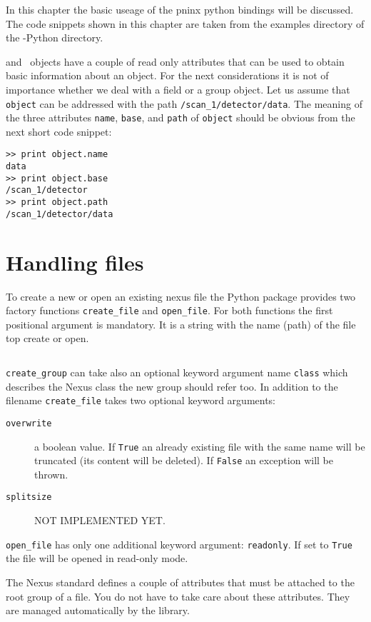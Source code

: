 
In this chapter the basic useage of the pninx python bindings will be discussed.
The code snippets shown in this chapter are taken from the examples directory of
the \pninx-Python directory.

\nxgroup and \nxfield\ objects have a couple of read only attributes that can be used to obtain
basic information about an object. For the next considerations it is not of
importance whether we deal with a field or a group object.
Let us assume that  {\tt object} can be addressed with the path 
{\tt /scan\_1/detector/data}. The meaning of the three attributes 
{\tt name}, {\tt base}, and {\tt path} of {\tt object} should be obvious from
the next short code snippet:
\begin{verbatim}
>> print object.name
data
>> print object.base
/scan_1/detector
>> print object.path
/scan_1/detector/data
\end{verbatim}

\section{Handling files}
To create a new or open an existing nexus file the Python package provides two
factory functions {\tt create\_file} and {\tt open\_file}. For both functions
the first positional argument is mandatory. It is a string with the name (path)
of the file top create or open.
\inputminted[linenos=true]{python}{../examples/nxfile_ex1.py}
{\tt create\_group} can take also an optional keyword argument name {\tt class}
which describes the Nexus class the new group should refer too. 
In addition to the filename {\tt create\_file} takes two optional keyword
arguments:
\begin{description}
 \item[{\tt overwrite}] a boolean value. If {\tt True} an already existing 
 file with the same name will be truncated (its content will be deleted). 
 If {\tt False} an exception will be thrown.
 \item[{\tt splitsize}] NOT IMPLEMENTED YET.
\end{description}
{\tt open\_file} has only one additional keyword argument: {\tt readonly}.
If set to {\tt True} the file will be opened in read-only mode.

The Nexus standard defines a couple of attributes that must be attached to the
root group of a file. You do not have to take care about these attributes. They
are managed automatically by the library. 

